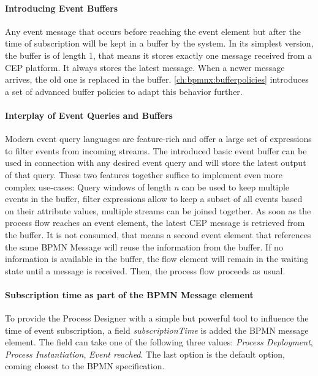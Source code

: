 \paragraph{Introducing Event Buffers}
Any event message that occurs before reaching the event element but after the time of subscription will be kept in a buffer by the system.
In its simplest version, the buffer is of length 1, that means it stores exactly one message received from a CEP platform. It always stores the latest message. When a newer message arrives, the old one is replaced in the buffer.
\autoref{ch:bpmnx:bufferpolicies} introduces a set of advanced buffer policies to adapt this behavior further.


\paragraph{Interplay of Event Queries and Buffers}
Modern event query languages are feature-rich and offer a large set of expressions to filter events from incoming streams. 
The introduced basic event buffer can be used in connection with any desired event query and will store the latest output of that query.
These two features together suffice to implement even more complex use-cases: Query windows of length \textit{n} can be used to keep multiple events in the buffer, filter expressions allow to keep a subset of all events based on their attribute values, multiple streams can be joined together.
As soon as the process flow reaches an event element, the latest CEP message is retrieved from the buffer. It is not consumed, that means a second event element that references the same BPMN Message will reuse the information from the buffer.
If no information is available in the buffer, the flow element will remain in the waiting state until a message is received. Then, the process flow proceeds as usual.


\paragraph{Subscription time as part of the BPMN Message element\newline}
To provide the Process Designer with a simple but powerful tool to influence the time of event subscription, a field \textit{subscriptionTime} is added the BPMN message element. 
The field can take one of the following three values: \textit{Process Deployment}, \textit{Process Instantiation}, \textit{Event reached}. The last option is the default option, coming closest to the BPMN specification.

